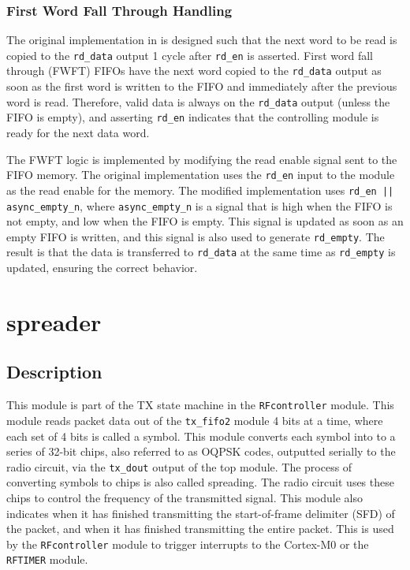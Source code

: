 \subsubsection{First Word Fall Through Handling}
The original implementation in \cite{async-fifo} is designed such that the next word to be read is copied to the \texttt{rd\_data} output 1 cycle after \texttt{rd\_en} is asserted. First word fall through (FWFT) FIFOs have the next word copied to the \texttt{rd\_data} output as soon as the first word is written to the FIFO and immediately after the previous word is read. Therefore, valid data is always on the \texttt{rd\_data} output (unless the FIFO is empty), and asserting \texttt{rd\_en} indicates that the controlling module is ready for the next data word.

The FWFT logic is implemented by modifying the read enable signal sent to the FIFO memory. The original implementation uses the \texttt{rd\_en} input to the module as the read enable for the memory. The modified implementation uses \texttt{rd\_en || async\_empty\_n}, where \texttt{async\_empty\_n} is a signal that is high when the FIFO is not empty, and low when the FIFO is empty. This signal is updated as soon as an empty FIFO is written, and this signal is also used to generate \texttt{rd\_empty}. The result is that the data is transferred to \texttt{rd\_data} at the same time as \texttt{rd\_empty} is updated, ensuring the correct behavior. 

\section{spreader} \label{spreader}
\subsection{Description}
This module is part of the TX state machine in the \texttt{RFcontroller} module. This module reads packet data out of the \texttt{tx\_fifo2} module 4 bits at a time, where each set of 4 bits is called a symbol. This module converts each symbol into to a series of 32-bit chips, also referred to as OQPSK codes, outputted serially to the radio circuit, via the \texttt{tx\_dout} output of the top module. The process of converting symbols to chips is also called spreading. The radio circuit uses these chips to control the frequency of the transmitted signal. This module also indicates when it has finished transmitting the start-of-frame delimiter (SFD) of the packet, and when it has finished transmitting the entire packet. This is used by the \texttt{RFcontroller} module to trigger interrupts to the Cortex-M0 or the \texttt{RFTIMER} module.

